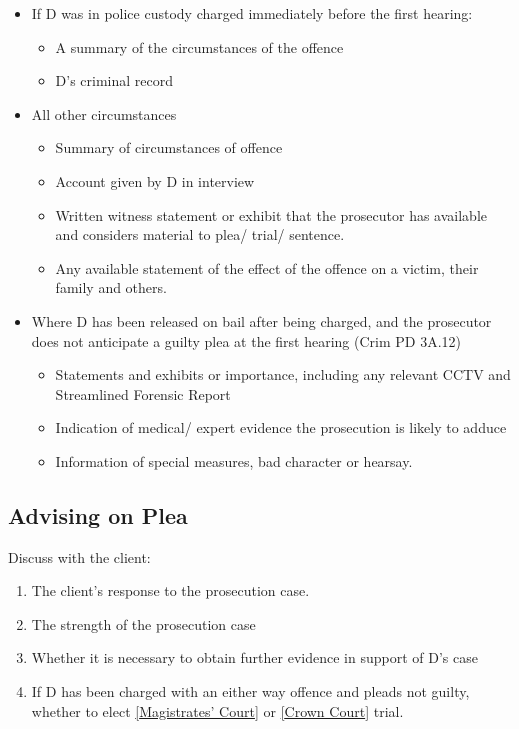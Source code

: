 \documentclass[
]{article}
\providecommand{\tightlist}{%
  \setlength{\itemsep}{0pt}\setlength{\parskip}{0pt}}
\begin{document}
\begin{itemize}
\tightlist
\item
  If D was in police custody charged immediately before the first
  hearing:

  \begin{itemize}
  \tightlist
  \item
    A summary of the circumstances of the offence
  \item
    D's criminal record
  \end{itemize}
\item
  All other circumstances

  \begin{itemize}
  \tightlist
  \item
    Summary of circumstances of offence
  \item
    Account given by D in interview
  \item
    Written witness statement or exhibit that the prosecutor has
    available and considers material to plea/ trial/ sentence.
  \item
    Any available statement of the effect of the offence on a victim,
    their family and others.
  \end{itemize}
\item
  Where D has been released on bail after being charged, and the
  prosecutor does not anticipate a guilty plea at the first hearing
  (Crim PD 3A.12)

  \begin{itemize}
  \tightlist
  \item
    Statements and exhibits or importance, including any relevant CCTV
    and Streamlined Forensic Report
  \item
    Indication of medical/ expert evidence the prosecution is likely to
    adduce
  \item
    Information of special measures, bad character or hearsay.
  \end{itemize}
\end{itemize}

\hypertarget{advising-on-plea}{%
\subsection{Advising on Plea}\label{advising-on-plea}}

Discuss with the client:

\begin{enumerate}
\def\labelenumi{\arabic{enumi}.}
\tightlist
\item
  The client's response to the prosecution case.
\item
  The strength of the prosecution case
\item
  Whether it is necessary to obtain further evidence in support of D's
  case
\item
  If D has been charged with an either way offence and pleads not
  guilty, whether to elect
  \href{maximum\%20compensation\%20of\%20£5,000\%20per\%20offence}{{[}Magistrates'
  Court{]}} or \href{no\%20financial\%20limit.}{{[}Crown Court{]}}
  trial.
\end{enumerate}
\end{document}
